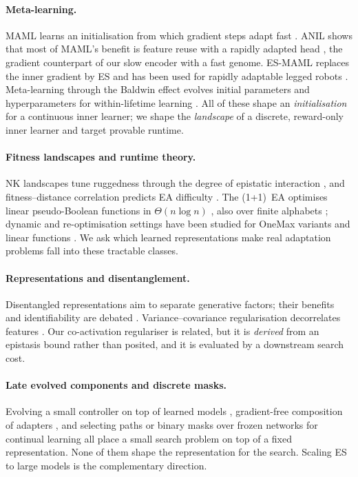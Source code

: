 \documentclass[11pt,a4paper]{article}
\theoremstyle{definition}
\theoremstyle{plain}
\theoremstyle{remark}
\begin{document}
\paragraph{Meta-learning.}
MAML learns an initialisation from which gradient steps adapt fast \cite{finn2017maml}. ANIL shows that most of MAML's benefit is feature reuse with a rapidly adapted head \cite{raghu2020anil}, the gradient counterpart of our slow encoder with a fast genome. ES-MAML replaces the inner gradient by ES \cite{song2020esmaml} and has been used for rapidly adaptable legged robots \cite{song2020rapidly}. Meta-learning through the Baldwin effect evolves initial parameters and hyperparameters for within-lifetime learning \cite{fernando2018baldwin}. All of these shape an \emph{initialisation} for a continuous inner learner; we shape the \emph{landscape} of a discrete, reward-only inner learner and target provable runtime.

\paragraph{Fitness landscapes and runtime theory.}
NK landscapes tune ruggedness through the degree of epistatic interaction \cite{kauffman1987walks}, and fitness--distance correlation predicts EA difficulty \cite{jones1995fdc}. The (1+1)~EA optimises linear pseudo-Boolean functions in $\Theta(n\log n)$ \cite{droste2002linear,witt2013tight}, also over finite alphabets \cite{doerr2012alphabet}; dynamic and re-optimisation settings have been studied for OneMax variants and linear functions \cite{kotzing2015dynamic,shi2019reopt}. We ask which learned representations make real adaptation problems fall into these tractable classes.

\paragraph{Representations and disentanglement.}
Disentangled representations aim to separate generative factors; their benefits and identifiability are debated \cite{locatello2019challenging}. Variance--covariance regularisation decorrelates features \cite{bardes2022vicreg}. Our co-activation regulariser is related, but it is \emph{derived} from an epistasis bound rather than posited, and it is evaluated by a downstream search cost.

\paragraph{Late evolved components and discrete masks.}
Evolving a small controller on top of learned models \cite{ha2018world}, gradient-free composition of adapters \cite{huang2024lorahub}, and selecting paths or binary masks over frozen networks for continual learning \cite{fernando2017pathnet,wortsman2020supsup} all place a small search problem on top of a fixed representation. None of them shape the representation for the search. Scaling ES to large models \cite{eggroll} is the complementary direction.
\end{document}
